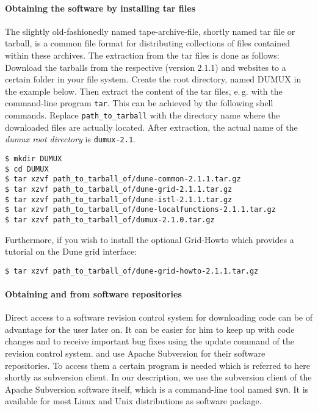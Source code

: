 \paragraph{Obtaining the software by installing tar files}
The slightly old-fashionedly named tape-archive-file, shortly named tar file or tarball, is a common file format for distributing collections of files contained within these archives.
The extraction from the tar files is done as follows: 
Download the tarballs from the respective \Dune (version 2.1.1) and \Dumux websites to a certain folder in your file system.
Create the {\Dune} root directory, named DUMUX in the example below. Then extract the content of the tar files, e.\,g. with the command-line program \texttt{tar}.
This can be achieved by the following shell commands. Replace \texttt{path\_to\_tarball} with the directory name where the downloaded files are actually located.
After extraction, the actual name of the \emph{dumux root directory} is \texttt{dumux-2.1}. 

\begin{lstlisting}[style=Bash]
$ mkdir DUMUX
$ cd DUMUX
$ tar xzvf path_to_tarball_of/dune-common-2.1.1.tar.gz 
$ tar xzvf path_to_tarball_of/dune-grid-2.1.1.tar.gz 
$ tar xzvf path_to_tarball_of/dune-istl-2.1.1.tar.gz 
$ tar xzvf path_to_tarball_of/dune-localfunctions-2.1.1.tar.gz 
$ tar xzvf path_to_tarball_of/dumux-2.1.0.tar.gz
\end{lstlisting}

Furthermore, if you wish to install the optional \Dune Grid-Howto which provides a tutorial on the Dune grid interface:

\begin{lstlisting}[style=Bash]
$ tar xzvf path_to_tarball_of/dune-grid-howto-2.1.1.tar.gz
\end{lstlisting}

\paragraph{Obtaining \Dune and \Dumux from software repositories} 

Direct access to a software revision control system for downloading code can be of advantage for the user later on. 
It can be easier for him to keep up with code changes and to receive important bug fixes using the update command of the revision control system. 
\Dune and \Dumux use Apache Subversion for their software repositories. To access them a certain program is needed which is referred to here shortly as subversion client. 
In our description, we use the subversion client of the Apache Subversion software itself, which is a command-line tool named \texttt{svn}. 
It is available for most Linux and Unix distributions as software package.

